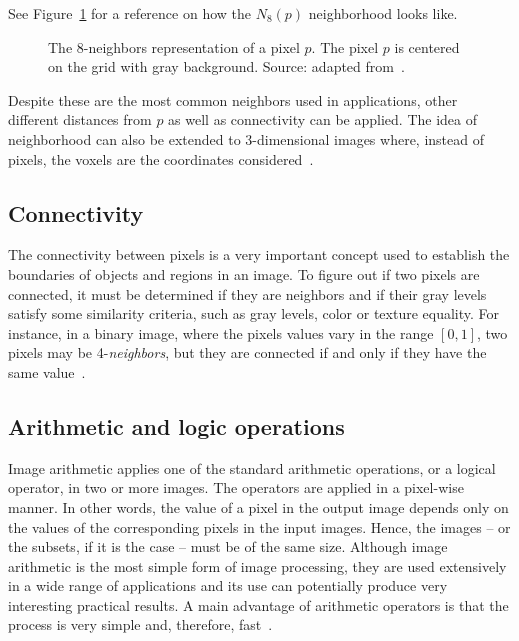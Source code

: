 See Figure~\ref{fig:n8-neighbors} for a reference on how the $N_8(p)$ neighborhood looks like.

\begin{figure}[ht]
    \centering

    \caption[The 8-\textit{neighbors} representation of a pixel $p$]{The 8-neighbors representation of a pixel $p$. The pixel $p$ is centered on the grid with gray background. Source: adapted from~\citet{pedrini:08}.}
    \label{fig:n8-neighbors}
\end{figure}

Despite these are the most common neighbors used in applications, other different distances from $p$ as well as connectivity can be applied. The idea of neighborhood can also be extended to 3-dimensional images where, instead of pixels, the voxels are the coordinates considered~\citep{pedrini:08}.


\subsection{Connectivity}
\label{sec:connectivity}
The connectivity between pixels is a very important concept used to establish the boundaries of objects and regions in an image. To figure out if two pixels are connected, it must be determined if they are neighbors and if their gray levels satisfy some similarity criteria, such as gray levels, color or texture equality. For instance, in a binary image, where the pixels values vary in the range $[0, 1]$, two pixels may be 4-\textit{neighbors}, but they are connected if and only if they have the same value~\citep{gonzalez:02}.


\subsection{Arithmetic and logic operations}
\label{sec:ari_logic_operations}
Image arithmetic applies one of the standard arithmetic operations, or a logical operator, in two or more images. The operators are applied in a pixel-wise manner. In other words, the value of a pixel in the output image depends only on the values of the corresponding pixels in the input images. Hence, the images -- or the subsets, if it is the case -- must be of the same size. Although image arithmetic is the most simple form of image processing, they are used extensively in a wide range of applications and its use can potentially produce very interesting practical results. A main advantage of arithmetic operators is that the process is very simple and, therefore, fast~\citep{gonzalez:02}.

